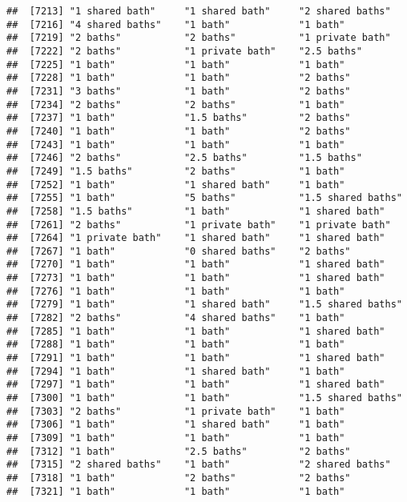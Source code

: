 \documentclass[
]{article}
\begin{document}
\begin{verbatim}
##  [7213] "1 shared bath"     "1 shared bath"     "2 shared baths"   
##  [7216] "4 shared baths"    "1 bath"            "1 bath"           
##  [7219] "2 baths"           "2 baths"           "1 private bath"   
##  [7222] "2 baths"           "1 private bath"    "2.5 baths"        
##  [7225] "1 bath"            "1 bath"            "1 bath"           
##  [7228] "1 bath"            "1 bath"            "2 baths"          
##  [7231] "3 baths"           "1 bath"            "2 baths"          
##  [7234] "2 baths"           "2 baths"           "1 bath"           
##  [7237] "1 bath"            "1.5 baths"         "2 baths"          
##  [7240] "1 bath"            "1 bath"            "2 baths"          
##  [7243] "1 bath"            "1 bath"            "1 bath"           
##  [7246] "2 baths"           "2.5 baths"         "1.5 baths"        
##  [7249] "1.5 baths"         "2 baths"           "1 bath"           
##  [7252] "1 bath"            "1 shared bath"     "1 bath"           
##  [7255] "1 bath"            "5 baths"           "1.5 shared baths" 
##  [7258] "1.5 baths"         "1 bath"            "1 shared bath"    
##  [7261] "2 baths"           "1 private bath"    "1 private bath"   
##  [7264] "1 private bath"    "1 shared bath"     "1 shared bath"    
##  [7267] "1 bath"            "0 shared baths"    "2 baths"          
##  [7270] "1 bath"            "1 bath"            "1 shared bath"    
##  [7273] "1 bath"            "1 bath"            "1 shared bath"    
##  [7276] "1 bath"            "1 bath"            "1 bath"           
##  [7279] "1 bath"            "1 shared bath"     "1.5 shared baths" 
##  [7282] "2 baths"           "4 shared baths"    "1 bath"           
##  [7285] "1 bath"            "1 bath"            "1 shared bath"    
##  [7288] "1 bath"            "1 bath"            "1 bath"           
##  [7291] "1 bath"            "1 bath"            "1 shared bath"    
##  [7294] "1 bath"            "1 shared bath"     "1 bath"           
##  [7297] "1 bath"            "1 bath"            "1 shared bath"    
##  [7300] "1 bath"            "1 bath"            "1.5 shared baths" 
##  [7303] "2 baths"           "1 private bath"    "1 bath"           
##  [7306] "1 bath"            "1 shared bath"     "1 bath"           
##  [7309] "1 bath"            "1 bath"            "1 bath"           
##  [7312] "1 bath"            "2.5 baths"         "2 baths"          
##  [7315] "2 shared baths"    "1 bath"            "2 shared baths"   
##  [7318] "1 bath"            "2 baths"           "2 baths"          
##  [7321] "1 bath"            "1 bath"            "1 bath"           

\end{verbatim}
\end{document}
